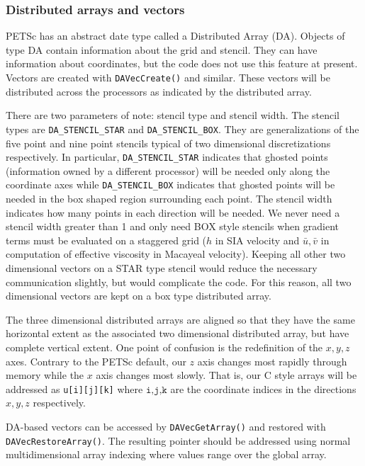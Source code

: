 \documentclass[11pt,final]{amsart}
\begin{document}
\subsubsection{Distributed arrays and vectors} PETSc has an abstract date type called a Distributed Array (DA). Objects of type DA contain
information about the grid and stencil. They can have information about coordinates, but
the code does not use this feature at present. Vectors are created with
\texttt{DAVecCreate()} and similar. These vectors will be distributed across the
processors as indicated by the distributed array.

There are two parameters of note: stencil type and stencil width.  The stencil types are
\verb|DA_STENCIL_STAR| and \verb|DA_STENCIL_BOX|.  They are generalizations of the five
point and nine point stencils typical of two dimensional discretizations respectively.  In
particular, \verb|DA_STENCIL_STAR| indicates that ghosted points (information owned by a
different processor) will be needed only along the coordinate axes while
\verb|DA_STENCIL_BOX| indicates that ghosted points will be needed in the box shaped
region surrounding each point.  The stencil width indicates how many points in each
direction will be needed.  We never need a stencil width greater than 1 and only need BOX
style stencils when gradient terms must be evaluated on a staggered grid ($h$ in SIA
velocity and $\bar{u},\bar{v}$ in computation of effective viscosity in Macayeal
velocity).  Keeping all other two dimensional vectors on a STAR type stencil
would reduce the necessary communication slightly, but would complicate the code.  For this
reason, all two dimensional vectors are kept on a box type distributed array.

The three dimensional distributed arrays are aligned so that they have the same horizontal
extent as the associated two dimensional distributed array, but have complete vertical
extent. One point of confusion is the redefinition of the $x,y,z$ axes. Contrary to the
PETSc default, our $z$ axis changes most rapidly through memory while the $x$ axis changes
most slowly. That is, our C style arrays will be addressed as \texttt{u[i][j][k]} where
$\texttt{i,j,k}$ are the coordinate indices in the directions $x,y,z$ respectively.

DA-based vectors can be accessed by \texttt{DAVecGetArray()} and restored with
\texttt{DAVecRestoreArray()}. The resulting pointer should be addressed using normal
multidimensional array indexing where values range over the global array.
\end{document}

